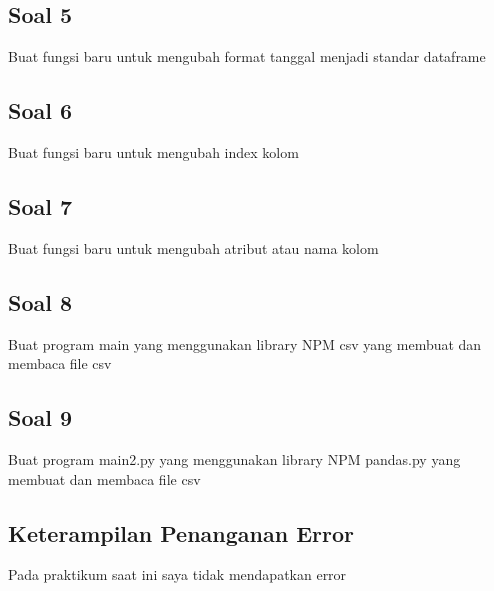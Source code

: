 \subsection{Soal 5}
Buat fungsi baru untuk mengubah format tanggal menjadi standar dataframe


\subsection{Soal 6}
Buat fungsi baru  untuk mengubah index kolom


\subsection{Soal 7}
Buat fungsi baru untuk mengubah atribut atau nama kolom


\subsection{Soal 8}
Buat program main yang menggunakan library NPM csv yang membuat dan membaca file csv




\subsection{Soal 9}
Buat program main2.py yang menggunakan library NPM pandas.py yang membuat dan membaca file csv



\subsection{Keterampilan Penanganan Error}
Pada praktikum saat ini saya tidak mendapatkan error

